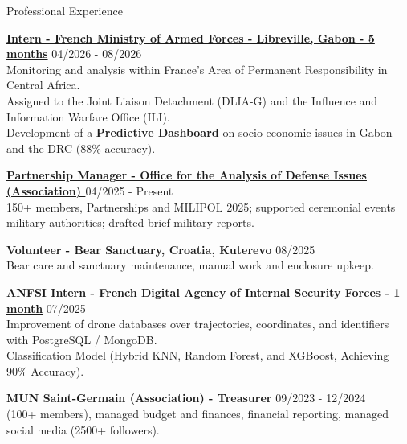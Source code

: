 \documentclass[a4paper]{resume} %
\begin{document}
\begin{rSection}{Professional Experience}

{\bf \href{https://www.linkedin.com/company/commandement-pour-l-afrique-cpa/posts/?feedView=all}{Intern - French Ministry of Armed Forces - Libreville, Gabon - 5 months}} \hfill {04/2026 - 08/2026}
\\Monitoring and analysis within France’s Area of Permanent Responsibility in Central Africa.
\\Assigned to the Joint Liaison Detachment (DLIA-G) and the Influence and Information Warfare Office (ILI).
\\Development of a \textbf{\href{https://github.com/Flor5378/-ENG-GlobalRiskIntelligencePlatform}{Predictive Dashboard}} on socio-economic issues in Gabon and the DRC (88\% accuracy).

{\bf \href{https://www.linkedin.com/company/bureau-analyse-des-enjeux-de-la-d%C3%A9fense/?viewAsMember=true}{Partnership Manager - Office for the Analysis of Defense Issues (Association) }} \hfill{04/2025 - Present}
\\
150+ members, Partnerships and MILIPOL 2025; supported ceremonial events military authorities; drafted brief military reports.

{\bf Volunteer - Bear Sanctuary, Croatia, Kuterevo} \hfill {08/2025}
\\
Bear care and sanctuary maintenance, manual work and enclosure upkeep.

{\bf \href{https://www.linkedin.com/company/anfsi/about/en/}{ANFSI Intern - French Digital Agency of Internal Security Forces - 1 month}} \hfill {07/2025}
\\
Improvement of drone databases over trajectories, coordinates, and identifiers with PostgreSQL / MongoDB.
\\Classification Model (Hybrid KNN, Random Forest, and XGBoost, Achieving 90\% Accuracy).

{\bf {MUN Saint-Germain (Association) - Treasurer}} \hfill {09/2023 - 12/2024}
\\(100+ members), managed budget and finances, financial reporting, managed social media (2500+ followers).

\end{rSection}  

\end{document}
